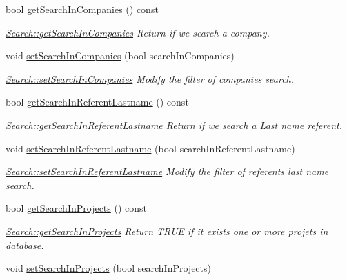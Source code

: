\begin{DoxyCompactItemize}
bool \hyperlink{classModels_1_1Search_ad38428f4aa81ba5951f82e0fcb92779c}{get\+Search\+In\+Companies} () const 
\begin{DoxyCompactList}\small\item\em \hyperlink{classModels_1_1Search_ad38428f4aa81ba5951f82e0fcb92779c}{Search\+::get\+Search\+In\+Companies} Return if we search a company. \end{DoxyCompactList}\item 
void \hyperlink{classModels_1_1Search_a3a630b2b2a48fb013b4c8cb9756fa813}{set\+Search\+In\+Companies} (bool search\+In\+Companies)
\begin{DoxyCompactList}\small\item\em \hyperlink{classModels_1_1Search_a3a630b2b2a48fb013b4c8cb9756fa813}{Search\+::set\+Search\+In\+Companies} Modify the filter of companies search. \end{DoxyCompactList}\item 
bool \hyperlink{classModels_1_1Search_aa415bcd966fef7bcd1cd5bd3373d57f6}{get\+Search\+In\+Referent\+Lastname} () const 
\begin{DoxyCompactList}\small\item\em \hyperlink{classModels_1_1Search_aa415bcd966fef7bcd1cd5bd3373d57f6}{Search\+::get\+Search\+In\+Referent\+Lastname} Return if we search a Last name referent. \end{DoxyCompactList}\item 
void \hyperlink{classModels_1_1Search_a4a897b3e19a0a6ce9e37ae1a73b39240}{set\+Search\+In\+Referent\+Lastname} (bool search\+In\+Referent\+Lastname)
\begin{DoxyCompactList}\small\item\em \hyperlink{classModels_1_1Search_a4a897b3e19a0a6ce9e37ae1a73b39240}{Search\+::set\+Search\+In\+Referent\+Lastname} Modify the filter of referents last name search. \end{DoxyCompactList}\item 
bool \hyperlink{classModels_1_1Search_a6c8f401bb696db96cc57a635d46910dd}{get\+Search\+In\+Projects} () const 
\begin{DoxyCompactList}\small\item\em \hyperlink{classModels_1_1Search_a6c8f401bb696db96cc57a635d46910dd}{Search\+::get\+Search\+In\+Projects} Return T\+R\+U\+E if it exists one or more projets in database. \end{DoxyCompactList}\item 
void \hyperlink{classModels_1_1Search_ab84375da3e302c7a871b4ced1c8d69c3}{set\+Search\+In\+Projects} (bool search\+In\+Projects)

\end{DoxyCompactItemize}
